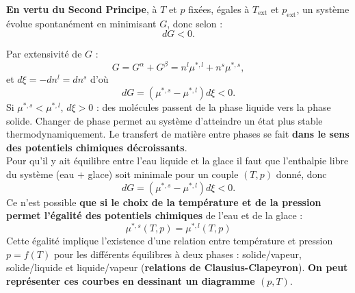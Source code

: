\documentclass[11pt,a4paper]{report}
\begin{document}
\textbf{En vertu du Second Principe}, à $T$ et $p$ fixées, égales à $T_\text{ext}$ et $p_\text{ext}$, un système évolue spontanément en minimisant $G$, donc selon :
\begin{equation}
	dG < 0.
\end{equation}

Par extensivité de $G$ :
\begin{equation}
	G = G^\alpha + G^\beta = n^l \mu^{*,l} + n^s \mu^{*,s},
\end{equation}
et $d\xi = -dn^l = dn^s$  d'où
\begin{equation}
	\boxed{dG = \left(\mu^{*,s} - \mu^{*,l} \right) d\xi < 0}.
\end{equation}
Si $\mu^{*,s} < \mu^{*,l}$, $d\xi > 0$ : des molécules passent de la phase liquide vers la phase solide. Changer de phase permet au système d'atteindre un état plus stable thermodynamiquement. Le transfert de matière entre phases se fait \textbf{dans le sens des potentiels chimiques décroissants}.\\

Pour qu'il y ait équilibre entre l'eau liquide et la glace il faut que l'enthalpie libre du système (eau $+$ glace) soit minimale pour un couple $(T,p)$ donné, donc
\begin{equation}
	dG = \left(\mu^{*,s} - \mu^{*,l} \right) d\xi < 0.
\end{equation}
Ce n'est possible \textbf{que si le choix de la température et de la pression permet l'égalité des potentiels chimiques} de l'eau et de la glace :
\begin{equation}
	\boxed{\mu^{*,s}(T,p) = \mu^{*,l}(T,p)}
\end{equation}
Cette égalité implique l'existence d'une relation entre température et pression $p = f(T)$ pour les différents équilibres à deux phases : solide/vapeur, solide/liquide et liquide/vapeur (\textbf{relations de Clausius-Clapeyron}). \textbf{On peut représenter ces courbes en dessinant un diagramme $(p,T)$}.
\end{document}

